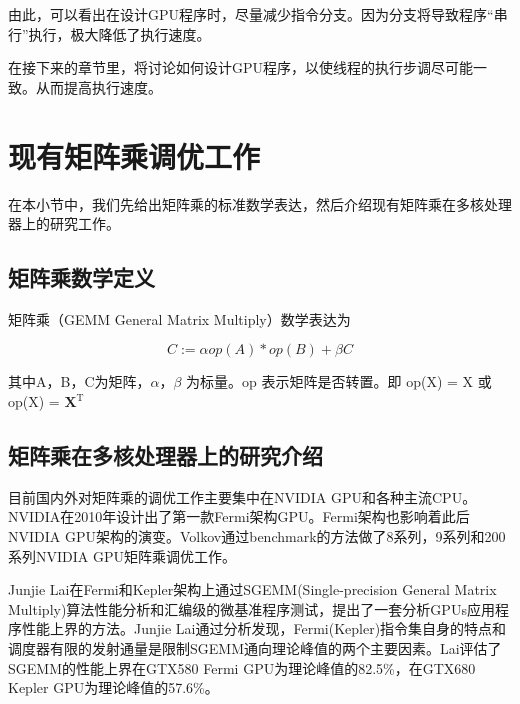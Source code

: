 由此，可以看出在设计GPU程序时，尽量减少指令分支。因为分支将导致程序“串行”执行，极大降低了执行速度。

在接下来的章节里，将讨论如何设计GPU程序，以使线程的执行步调尽可能一致。从而提高执行速度。

\section{现有矩阵乘调优工作}
在本小节中，我们先给出矩阵乘的标准数学表达，然后介绍现有矩阵乘在多核处理器上的研究工作。

\subsection{矩阵乘数学定义}
矩阵乘（GEMM General Matrix Multiply）数学表达为

\begin{equation}
	C:= \alpha op(A)*op(B) + \beta C
\end{equation}

其中A，B，C为矩阵，$\alpha$，$\beta$ 为标量。op 表示矩阵是否转置。即 op(X) = X 或 op(X) = $\mathbf{X}^\mathrm{T}$

\subsection{矩阵乘在多核处理器上的研究介绍}
目前国内外对矩阵乘的调优工作主要集中在NVIDIA GPU和各种主流CPU。NVIDIA在2010年设计出了第一款Fermi架构GPU。Fermi架构也影响着此后NVIDIA GPU架构的演变。Volkov通过benchmark的方法做了8系列，9系列和200系列NVIDIA GPU矩阵乘调优工作。

Junjie Lai在Fermi和Kepler架构上通过SGEMM(Single-precision General Matrix Multiply)算法性能分析和汇编级的微基准程序测试，提出了一套分析GPUs应用程序性能上界的方法。Junjie Lai通过分析发现，Fermi(Kepler)指令集自身的特点和调度器有限的发射通量是限制SGEMM通向理论峰值的两个主要因素。Lai评估了SGEMM的性能上界在GTX580 Fermi GPU为理论峰值的82.5\%，在GTX680 Kepler GPU为理论峰值的57.6\%。

